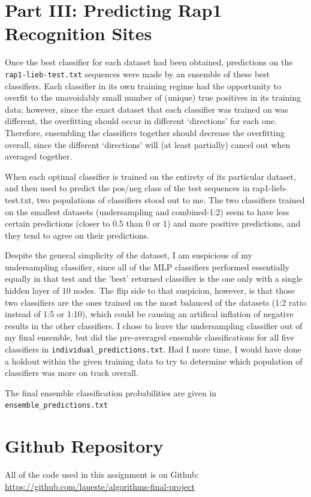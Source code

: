 \documentclass[12pt]{article}
\begin{document}
\section*{Part III: Predicting Rap1 Recognition Sites}
Once the best classifier for each dataset had been obtained, predictions on the \verb|rap1-lieb-test.txt| sequences were made by an ensemble of these best classifiers. Each classifier in its own training regime had the opportunity to overfit to the unavoidably small number of (unique) true positives in its training data; however, since the exact dataset that each classifier was trained on was different, the overfitting should occur in different `directions' for each one. Therefore, ensembling the classifiers together should decrease the overfitting overall, since the different `directions' will (at least partially) cancel out when averaged together.
\par When each optimal classifier is trained on the entirety of its particular dataset, and then used to predict the pos/neg class of the test sequences in rap1-lieb-test.txt, two populations of classifiers stood out to me. The two classifiers trained on the smallest datasets (undersampling and combined-1:2) seem to have less certain predictions (closer to 0.5 than 0 or 1) and more positive predictions, and they tend to agree on their predictions. 
\par Despite the general simplicity of the dataset, I am suspicious of my undersampling classifier, since all of the MLP classifiers performed essentially equally in that test and the 'best' returned classifier is the one only with a single hidden layer of 10 nodes. The flip side to that suspicion, however, is that those two classifiers are the ones trained on the most balanced of the datasets (1:2 ratio instead of 1:5 or 1:10), which could be causing an artifical inflation of negative results in the other classifiers. I chose to leave the undersampling classifier out of my final ensemble, but did the pre-averaged ensemble classifications for all five classifiers in \verb|individual_predictions.txt|. Had I more time, I would have done a holdout within the given training data to try to determine which population of classifiers was more on track overall.
\par The final ensemble classification probabilities are given in \verb|ensemble_predictions.txt|
\section*{Github Repository}
All of the code used in this assignment is on Github: \url{https://github.com/laueste/algorithms-final-project}
\end{document}
